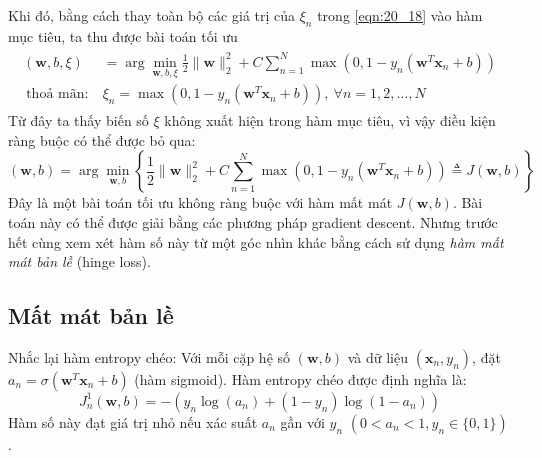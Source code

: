 Khi đó, bằng cách thay toàn bộ các giá trị của $\xi_n$ trong \eqref{eqn:20_18}
vào hàm mục tiêu, ta thu được bài toán tối ưu
\begin{eqnarray} 
\label{eqn:20_19}
\begin{aligned}
    (\mathbf{w}, b, \xi) &= \arg \min_{\mathbf{w}, b, \xi} 
    \frac{1}{2}{\|\mathbf{w}\|_2^2} + C \sum_{n=1}^N \max(0, 1 - y_n(\mathbf{w}^T\mathbf{x}_n + b)) \\\ 
    \text{thoả mãn:}~ & \xi_n = \max(0, 1 - y_n(\mathbf{w}^T\mathbf{x}_n + b)), ~\forall n = 1, 2, \dots, N 
 \end{aligned} 
\end{eqnarray} 
Từ đây ta thấy biến số $\xi$ không xuất hiện trong hàm mục tiêu, vì vậy điều kiện ràng buộc có thể được bỏ qua:
\begin{equation} 
    \label{eqn:20_20}
    (\mathbf{w}, b)= \arg \min_{\mathbf{w}, b} \left\{
    \frac{1}{2}{\|\mathbf{w}\|_2^2} + C \sum_{n=1}^N \max(0, 1 -
        y_n(\mathbf{w}^T\mathbf{x}_n + b)) \triangleq J(\mathbf{w}, b) \right\}
\end{equation} 
Đây là một bài toán tối ưu không ràng buộc với hàm mất mát $J(\mathbf{w}, b)$.
Bài toán này có thể được giải bằng các phương pháp gradient descent. Nhưng trước
hết cùng xem xét hàm số này từ một góc nhìn khác bằng
cách sử dụng \textit{hàm mất mát bản lề} (hinge loss). 
 
\subsection{Mất mát bản lề}
Nhắc lại hàm entropy chéo: Với mỗi cặp hệ số $(\mathbf{w},
b)$ và dữ liệu $(\mathbf{x}_n, y_n)$, đặt $a_n = \sigma(\mathbf{w}^T\mathbf{x}_n +
b)$ (hàm sigmoid). Hàm
entropy chéo được định nghĩa là: 
\begin{equation} J_n^1(\mathbf{w}, b)
= -(y_n \log(a_n) + (1 - y_n) \log(1 - a_n))
\end{equation} 
Hàm số này đạt giá trị nhỏ nếu xác suất $a_n$
gần với $y_n$ $(0 < a_n < 1, y_n \in \{0, 1\})$.

